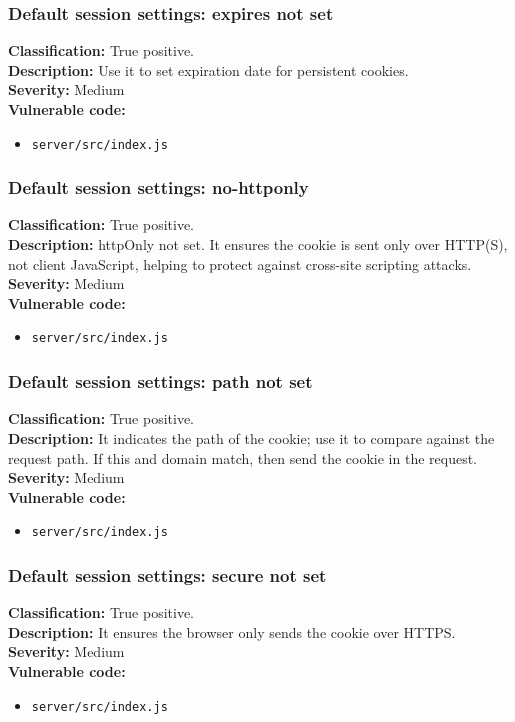 \documentclass[]{article}
\begin{document}
\subsubsection{Default session settings: expires not set}
\textbf{Classification:} {True positive.} \\
\textbf{Description:} Use it to set expiration date for persistent cookies. \\
\textbf{Severity:}  Medium\\ 
\textbf{Vulnerable code:}
\begin{itemize}
    \item \texttt{server/src/index.js}
\end{itemize}


\subsubsection{Default session settings: no-httponly}
\textbf{Classification:} {True positive.} \\
\textbf{Description:} httpOnly not set. It ensures the cookie is sent only over
          HTTP(S), not client JavaScript, helping to protect against cross-site scripting attacks. \\
\textbf{Severity:}  Medium\\ 
\textbf{Vulnerable code:}
\begin{itemize}
    \item \texttt{server/src/index.js}
\end{itemize}


\subsubsection{Default session settings: path not set}
\textbf{Classification:} {True positive.} \\
\textbf{Description:} It indicates the path of the cookie; use it to compare against the request path. If this and domain match, then send the cookie in the request.\\
\textbf{Severity:}  Medium\\ 
\textbf{Vulnerable code:}
\begin{itemize}
    \item \texttt{server/src/index.js}
\end{itemize}

\subsubsection{Default session settings: secure not set}
\textbf{Classification:} {True positive.} \\
\textbf{Description:} It ensures the browser only sends the cookie over HTTPS. \\
\textbf{Severity:}  Medium\\ 
\textbf{Vulnerable code:}
\begin{itemize}
    \item \texttt{server/src/index.js}
\end{itemize}
\end{document}
